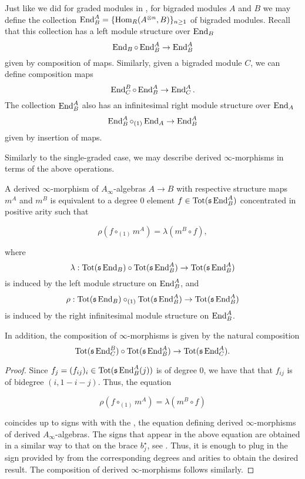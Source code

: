 \documentclass[Thesis.tex]{subfiles}
\begin{document}
Just like we did for graded modules in , for bigraded modules $A$ and $B$ we may define the collection $\operatorname{End}^A_B=\{\operatorname{Hom}_R(A^{\otimes n}, B)\}_{n\geq 1}$ of bigraded modules. Recall that this collection has a left module structure over $\operatorname{End}_B$
\[\operatorname{End}_B\circ \operatorname{End}^A_B\to \operatorname{End}^A_B\]
given by composition of maps. Similarly, given a bigraded module $C$, we can define composition maps
\[\operatorname{End}^B_C\circ \operatorname{End}^A_B\to \operatorname{End}^A_C.\]
The collection $\operatorname{End}^A_B$ also has an infinitesimal right module structure over $\operatorname{End}_A$
\[\operatorname{End}^A_B\circ_{(1)}\operatorname{End}_A\to \operatorname{End}^A_B\]
given by insertion of maps.

Similarly to the single-graded case, we may describe derived $\infty$-morphisms in terms of the above operations.

\begin{lem}\label{dinfinitymorphism}
A derived $\infty$-morphism of $A_\infty$-algebras $A\to B$ with respective structure maps $m^A$ and $m^B$ is equivalent to a degree 0 element $f\in\operatorname{Tot}(\mathfrak{s}\operatorname{End}^A_B)$ concentrated in positive arity such that

 \[\rho(f\circ_{(1)}m^A)=\lambda(m^B\circ f),\] 

where \[\lambda:\operatorname{Tot}(\mathfrak{s}\operatorname{End}_B)\circ \operatorname{Tot}(\mathfrak{s}\operatorname{End}^A_B)\to \operatorname{Tot}(\mathfrak{s}\operatorname{End}^A_B)\] is induced by the left module structure on $\operatorname{End}^A_B$, and \[\rho:\operatorname{Tot}(\mathfrak{s}\operatorname{End}_B)\circ_{(1)}\operatorname{Tot}(\mathfrak{s}\operatorname{End}^A_B)\to \operatorname{Tot}(\mathfrak{s}\operatorname{End}^A_B)\] is induced by the right infinitesimal module structure on $\operatorname{End}^A_B$. 

In addition, the composition of $\infty$-morphisms is given by the natural composition \[\operatorname{Tot}(\mathfrak{s}\operatorname{End}^B_C)\circ \operatorname{Tot}(\mathfrak{s}\operatorname{End}^A_B)\to \operatorname{Tot}(\mathfrak{s}\operatorname{End}^A_C).\]
\end{lem}
\begin{proof}
Since $f_j=(f_{ij})_i\in\operatorname{Tot}(\mathfrak{s}\operatorname{End}^A_B(j))$ is of degree $0$, we have that that $f_{ij}$ is of bidegree $(i,1-i-j)$. Thus, the equation

\[\rho(f\circ_{(1)}m^A)=\lambda(m^B\circ f)\] 

coincides up to signs with with the , the equation defining derived $\infty$-morphisms of derived $A_\infty$-algebras. The signs that appear in the above equation are obtained in a similar way to that on the brace $b_j^\star$, see . Thus, it is enough to plug in the sign provided by  from the corresponding degrees and arities to obtain the desired result. The composition of derived $\infty$-morphisms follows similarly.
\end{proof}
\end{document}
